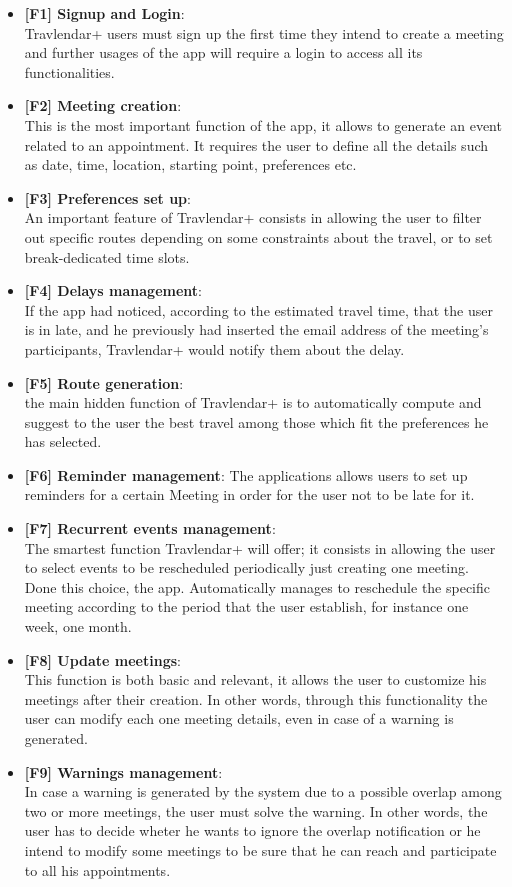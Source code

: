
\begin{itemize}

\item \textbf{[\hypertarget{F1}{F1}] Signup and Login}: \\Travlendar+ users must sign up the first time they intend to create a meeting and further usages of the app will require a login to access all its functionalities.
\item \textbf{[\hypertarget{F2}{F2}] Meeting creation}: \\This is the most important function of the app, it allows to generate an event related to an appointment. It requires the user to define all the details such as date, time, location, starting point, preferences etc. 
\item \textbf{[\hypertarget{F3}{F3}] Preferences set up}: \\An important feature of Travlendar+ consists in allowing the user to filter out specific routes depending on some constraints about the travel, or to set break-dedicated time slots.
\item \textbf{[\hypertarget{F4}{F4}] Delays management}:  \\If the app had noticed, according to the estimated travel time, that the user is in late, and he previously had inserted the email address of the meeting’s participants, Travlendar+ would notify them about the delay. 
\item \textbf{[\hypertarget{F5}{F5}] Route generation}:\\ the main hidden function of Travlendar+ is to automatically compute and suggest to the user the best travel among those which fit the preferences he has selected.
\item \textbf{[\hypertarget{F6}{F6}] Reminder management}: The applications allows users to set up reminders for a certain Meeting in order for the user not to be late for it.
\item \textbf{[\hypertarget{F7}{F7}] Recurrent events management}:\\ The smartest function Travlendar+ will offer; it consists in allowing the user to select events to be rescheduled periodically just creating one meeting. Done this choice, the app. Automatically manages to  reschedule the specific meeting according to the period that the user establish, for instance one week, one month.
\item \textbf{[\hypertarget{F8}{F8}] Update meetings}: \\This function is both basic and relevant, it allows the user to customize his meetings after their creation. In other words, through this functionality the user can modify each one meeting details, even in case of a warning is generated.
\item \textbf{[\hypertarget{F9}{F9}] Warnings management}: \\ In case a warning is generated by the system due to a possible overlap among two or more meetings, the user must solve the warning. In other words, the user has to decide wheter he wants to ignore the overlap notification or he intend to modify some meetings to be sure that he can reach and participate to all his appointments.


\end{itemize}

 
